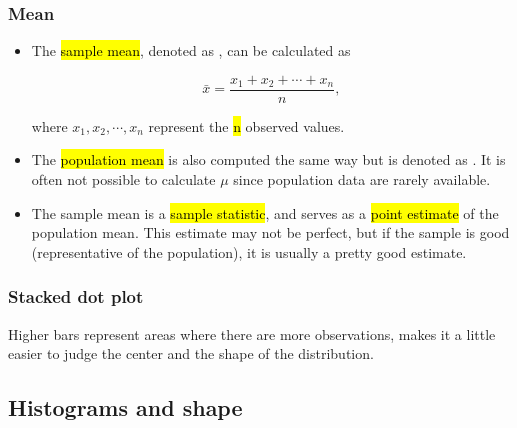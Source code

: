 \documentclass[slidestop,compress,mathserif]{beamer}
\begin{document}
\begin{frame}
\frametitle{Mean}

\begin{itemize}

\item The \hl{sample mean}, denoted as , can be calculated as

\[ \bar{x} = \frac{x_1 + x_2 + \cdots + x_n}{n}, \]

where $x_1, x_2, \cdots, x_n$ represent the \hl{n} observed values.

\item The \hl{population mean} is also computed the same way but is denoted as \mathhl{\mu}. It is often not possible to calculate $\mu$ since population data are rarely available.

\item The sample mean is a \hl{sample statistic}, and serves as a \hl{point estimate} of the population mean. This estimate may not be perfect, but if the sample is good (representative of the population), it is usually a pretty good estimate. 

\end{itemize}

\end{frame}


\begin{frame}
\frametitle{Stacked dot plot}

Higher bars represent areas where there are more observations, makes it a little easier to judge the center and the shape of the distribution.

\begin{center}
\end{center}

\end{frame}


\subsection{Histograms and shape}

\end{document}
